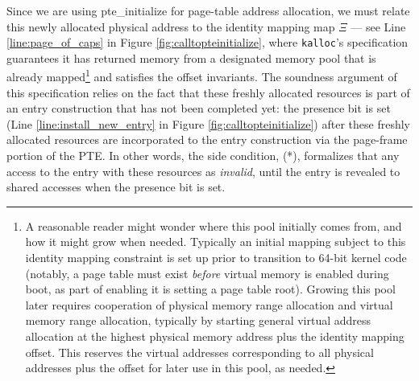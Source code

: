Since we are using \textsf{pte\_initialize} for page-table address allocation, we must relate this newly
allocated physical address to the identity mapping map $\Xi$ --- 
see Line \ref{line:page_of_caps} in Figure \ref{fig:calltopteinitialize}, where
\texttt{kalloc}'s specification guarantees it has returned memory from a designated memory
pool that is already mapped\footnote{A reasonable reader might wonder where this pool
initially comes from, and how it might grow when needed. Typically an initial mapping subject to this identity mapping
constraint is set up prior to transition to 64-bit kernel code (notably,
a page table must exist \emph{before} virtual memory is enabled during boot, as part of enabling it is setting
a page table root).
Growing this pool later requires cooperation of physical memory range allocation and virtual memory range allocation,
typically by starting general virtual address allocation at the highest physical memory address plus the identity mapping offset.
This reserves the virtual addresses corresponding to all physical addresses plus the offset for later use in this pool,
as needed.
} and satisfies the offset invariants.
The soundness argument of this specification relies on the fact that these freshly allocated resources is part 
of an entry construction that has not been completed yet: the presence bit is set 
(Line \ref{line:install_new_entry} in Figure \ref{fig:calltopteinitialize}) after these freshly allocated resources are incorporated to the 
entry construction via the page-frame portion of the PTE. In other words, the side condition, (*),
 formalizes that any access to the entry with these resources as \textit{invalid}, until the entry is revealed to 
shared accesses when the presence bit is set. 

